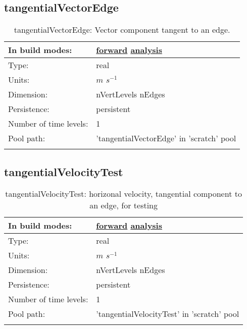 \subsection[tangentialVectorEdge]{tangentialVectorEdge}
\label{subsec:var_sec_scratch_tangentialVectorEdge}
\begin{center}
\begin{longtable}{| p{2.0in} | p{4.0in} |}
        \hline 
        In build modes: & \hyperref[subsec:forward_var_tab_scratch]{forward} \hyperref[subsec:analysis_var_tab_scratch]{analysis} \\
        \hline 
        Type: & real \\
        \hline 
        Units: & $m$ $s^{-1}$ \\
        \hline 
        Dimension: & nVertLevels nEdges \\
        \hline 
        Persistence: & persistent \\
        \hline 
        Number of time levels: & 1 \\
        \hline 
            Pool path: & 'tangentialVectorEdge' in 'scratch' pool
 \\
		 \hline 
    \caption{tangentialVectorEdge: Vector component tangent to an edge.}
\end{longtable}
\end{center}
\subsection[tangentialVelocityTest]{tangentialVelocityTest}
\label{subsec:var_sec_scratch_tangentialVelocityTest}
\begin{center}
\begin{longtable}{| p{2.0in} | p{4.0in} |}
        \hline 
        In build modes: & \hyperref[subsec:forward_var_tab_scratch]{forward} \hyperref[subsec:analysis_var_tab_scratch]{analysis} \\
        \hline 
        Type: & real \\
        \hline 
        Units: & $m$ $s^{-1}$ \\
        \hline 
        Dimension: & nVertLevels nEdges \\
        \hline 
        Persistence: & persistent \\
        \hline 
        Number of time levels: & 1 \\
        \hline 
            Pool path: & 'tangentialVelocityTest' in 'scratch' pool
 \\
		 \hline 
    \caption{tangentialVelocityTest: horizonal velocity, tangential component to an edge, for testing}
\end{longtable}
\end{center}
